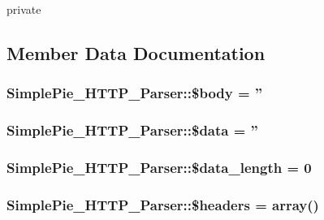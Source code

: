 private 

\subsection{Member Data Documentation}
\hypertarget{class_simple_pie___h_t_t_p___parser_ad821393ea08bb8893a46b1d765f8e700}{
\subsubsection[{\$body}]{\setlength{\rightskip}{0pt plus 5cm}Simple\-Pie\-\_\-\-H\-T\-T\-P\-\_\-\-Parser\-::\$body = ''}}\label{class_simple_pie___h_t_t_p___parser_ad821393ea08bb8893a46b1d765f8e700}
\hypertarget{class_simple_pie___h_t_t_p___parser_a832e9f2917df2a9ada4035d943003669}{
\subsubsection[{\$data}]{\setlength{\rightskip}{0pt plus 5cm}Simple\-Pie\-\_\-\-H\-T\-T\-P\-\_\-\-Parser\-::\$data = ''}}\label{class_simple_pie___h_t_t_p___parser_a832e9f2917df2a9ada4035d943003669}
\hypertarget{class_simple_pie___h_t_t_p___parser_a590324d35d13662f0ce49a13cb69faf3}{
\subsubsection[{\$data\-\_\-length}]{\setlength{\rightskip}{0pt plus 5cm}Simple\-Pie\-\_\-\-H\-T\-T\-P\-\_\-\-Parser\-::\$data\-\_\-length = 0}}\label{class_simple_pie___h_t_t_p___parser_a590324d35d13662f0ce49a13cb69faf3}
\hypertarget{class_simple_pie___h_t_t_p___parser_a7e57f818ac40d2c0e3b06731559a71d9}{
\subsubsection[{\$headers}]{\setlength{\rightskip}{0pt plus 5cm}Simple\-Pie\-\_\-\-H\-T\-T\-P\-\_\-\-Parser\-::\$headers = array()}}\label{class_simple_pie___h_t_t_p___parser_a7e57f818ac40d2c0e3b06731559a71d9}
